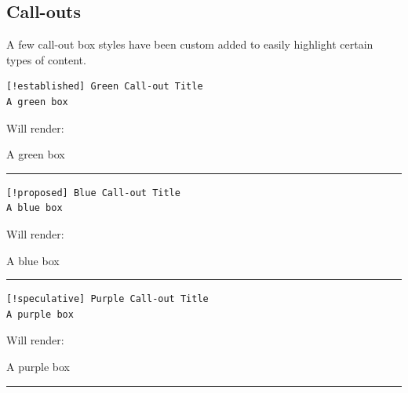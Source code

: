 \documentclass[
  12pt,
  openany]{book}
\begin{document}
\subsection{Call-outs}\label{call-outs}

A few call-out box styles have been custom added to easily highlight
certain types of content.

\begin{codebox}
\begin{verbatim}
[!established] Green Call-out Title
A green box
\end{verbatim}

\end{codebox}

Will render:

\begin{establishedbox}
A green box
\end{establishedbox}

\begin{center}\rule{0.5\linewidth}{0.5pt}\end{center}

\begin{codebox}
\begin{verbatim}
[!proposed] Blue Call-out Title
A blue box
\end{verbatim}

\end{codebox}

Will render:

\begin{proposedbox}
A blue box
\end{proposedbox}

\begin{center}\rule{0.5\linewidth}{0.5pt}\end{center}

\begin{codebox}
\begin{verbatim}
[!speculative] Purple Call-out Title
A purple box
\end{verbatim}

\end{codebox}

Will render:

\begin{speculativebox}
A purple box
\end{speculativebox}

\begin{center}\rule{0.5\linewidth}{0.5pt}\end{center}
\end{document}
